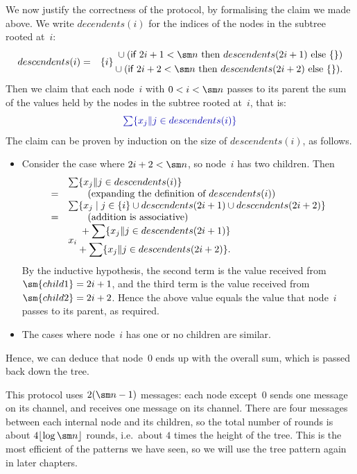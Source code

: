 
We now justify the correctness of the protocol, by formalising the claim we
made above.  We write $decendents(i)$ for the indices of the nodes in the
subtree rooted at~$i$:
%
\begin{eqnarray*}
descendents(i) & = & 
  \set{i} 
    \begin{align}
      \null \union (\If 2i+1 < \sm n \mbox{ then } descendents(2i+1) 
      \mbox{ else } \set{}) \\
      \null \union
      (\If 2i+2 < \sm n  \mbox{ then }  descendents(2i+2) \mbox{ else } \set{}).
    \end{align}
\end{eqnarray*}
%
Then we claim that each node~$i$ with $0 < i < \sm n$ passes to its parent the
sum of the values held by the nodes in the subtree rooted at~$i$, that is:
%
\[\mstyle
\textstyle\sum \set{x_j \| j \in descendents(i)}
\]
The claim can be proven by induction on the size of $descendents(i)$, as
follows.
%
\begin{itemize}
\item
Consider the case where $2i + 2 < \sm n$, so node~$i$ has two children.  Then
\[
\begin{array}{cl}
& \sum \set{x_j \| j \in descendents(i)}  \\
= & \qquad\mbox{(expanding the definition of $descendents(i)$)} \\

& \sum 
  \set{x_j \mid j \in \set{i} \union  descendents(2i+1) \union
               descendents(2i+2) } \\
= & \qquad\mbox{(addition is associative)} \\ 
& x_i 
  \begin{align}
  \null +  \sum \set{x_j \| j \in descendents(2i+1)} \\
  \null +  \sum \set{x_j \| j \in descendents(2i+2)}.
  \end{align}
\end{array}
\]
By the inductive hypothesis, the second term is the value received from
$\sm{child1} = 2i+1$, and the third term is the value received from
$\sm{child2} = 2i+2$.  Hence the above value equals the value that node~$i$
passes to its parent, as required.

\item
The cases where node~$i$ has one or no children are similar.
\end{itemize}
%
Hence, we can deduce that node~$0$ ends up with the overall sum, which is
passed back down the tree.

This protocol uses $2(\sm n-1)$ messages: each node except~0 sends one message
on its  channel, and receives one message on its 
channel.  There are four messages between each internal node and its
children, so the total number of rounds is about $4\lfloor \log \sm n \rfloor$
rounds, i.e.~about $4$ times the height of the tree.  This is the most
efficient of the patterns we have seen, so we will use the tree pattern again
in later chapters.
